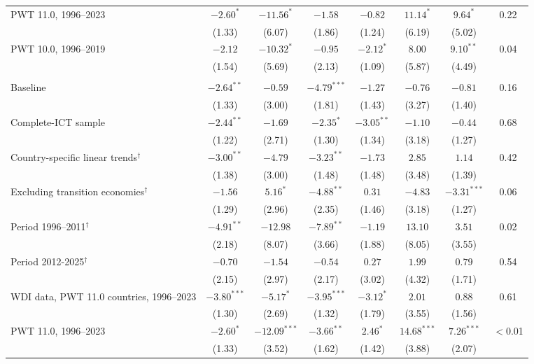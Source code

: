 \documentclass[pdflatex,sn-basic]{sn-jnl}%
\theoremstyle{thmstyleone}
\theoremstyle{thmstyletwo}
\renewenvironment{table}[1][]{\begin{tableorg}[#1]\centering\tablebodyfont}{\end{tableorg}}
\begin{document}
\begin{table}[!p]
{\begin{threeparttable}
\begin{tabular}{lccccccc}
\quad PWT 11.0, 1996--2023 & $-2.60^{*}$ & $-11.56^{*}$ & $-1.58$ & $-0.82$ & $11.14^{*}$ & $9.64^{*}$ & 0.22\\
 & (1.33) & (6.07) & (1.86) & (1.24) & (6.19) & (5.02) & \\
\quad PWT 10.0, 1996--2019 & $-2.12$ & $-10.32^{*}$ & $-0.95$ & $-2.12^{*}$ & $8.00$ & $9.10^{**}$ & 0.04\\
 & (1.54) & (5.69) & (2.13) & (1.09) & (5.87) & (4.49) & \\
\addlinespace
\multicolumn{8}{l}{\textit{Panel B. Moderator: initial log GDP per worker}}\\
\quad Baseline & $-2.64^{**}$ & $-0.59$ & $-4.79^{***}$ & $-1.27$ & $-0.76$ & $-0.81$ & 0.16\\
 & (1.33) & (3.00) & (1.81) & (1.43) & (3.27) & (1.40) & \\
\quad Complete-ICT sample & $-2.44^{**}$ & $-1.69$ & $-2.35^{*}$ & $-3.05^{**}$ & $-1.10$ & $-0.44$ & 0.68\\
 & (1.22) & (2.71) & (1.30) & (1.34) & (3.18) & (1.27) & \\
\quad Country-specific linear trends$^{\dagger}$ & $-3.00^{**}$ & $-4.79$ & $-3.23^{**}$ & $-1.73$ & $2.85$ & $1.14$ & 0.42\\
 & (1.38) & (3.00) & (1.48) & (1.48) & (3.48) & (1.39) & \\
\quad Excluding transition economies$^{\dagger}$ & $-1.56$ & $5.16^{*}$ & $-4.88^{**}$ & $0.31$ & $-4.83$ & $-3.31^{***}$ & 0.06\\
 & (1.29) & (2.96) & (2.35) & (1.46) & (3.18) & (1.27) & \\
\quad Period 1996--2011$^{\dagger}$ & $-4.91^{**}$ & $-12.98$ & $-7.89^{**}$ & $-1.19$ & $13.10$ & $3.51$ & 0.02\\
 & (2.18) & (8.07) & (3.66) & (1.88) & (8.05) & (3.55) & \\
\quad Period 2012-2025$^{\dagger}$ & $-0.70$ & $-1.54$ & $-0.54$ & $0.27$ & $1.99$ & $0.79$ & 0.54\\
 & (2.15) & (2.97) & (2.17) & (3.02) & (4.32) & (1.71) & \\
\quad WDI data, PWT 11.0 countries, 1996--2023 & $-3.80^{***}$ & $-5.17^{*}$ & $-3.95^{***}$ & $-3.12^{*}$ & $2.01$ & $0.88$ & 0.61\\
 & (1.30) & (2.69) & (1.32) & (1.79) & (3.55) & (1.56) & \\
\quad PWT 11.0, 1996--2023 & $-2.60^{*}$ & $-12.09^{***}$ & $-3.66^{**}$ & $2.46^{*}$ & $14.68^{***}$ & $7.26^{***}$ & $<$0.01\\
 & (1.33) & (3.52) & (1.62) & (1.42) & (3.88) & (2.07) & \\

\end{tabular}
\end{threeparttable}}
\end{table}
\end{document}
